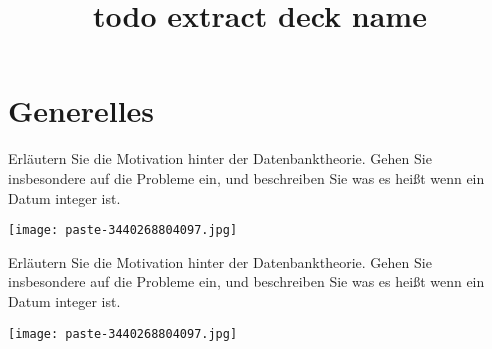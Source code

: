 \documentclass{article}
\title{todo extract deck name}
\begin{document}
\section{Generelles}
\begin{tcolorbox}[colback=white!10!white,colframe=lightgray!75!black,
  savelowerto=\jobname_ex.tex]

\begin{center}
 Erl\"autern Sie die Motivation hinter der Datenbanktheorie. Gehen Sie insbesondere auf die 
Probleme
 ein, und beschreiben Sie was es heißt wenn ein Datum 
integer
ist. 

\end{center}

\tcblower

\justifying
\texttt{[image: paste-3440268804097.jpg]}
\end{tcolorbox}
\begin{tcolorbox}[colback=white!10!white,colframe=lightgray!75!black,
  savelowerto=\jobname_ex.tex]

\begin{center}
 Erläutern Sie die Motivation hinter der Datenbanktheorie. Gehen Sie insbesondere auf die 
Probleme
 ein, und beschreiben Sie was es heißt wenn ein Datum 
integer
ist. 

\end{center}

\tcblower

\justifying
\texttt{[image: paste-3440268804097.jpg]}
\end{tcolorbox}
\end{document}
